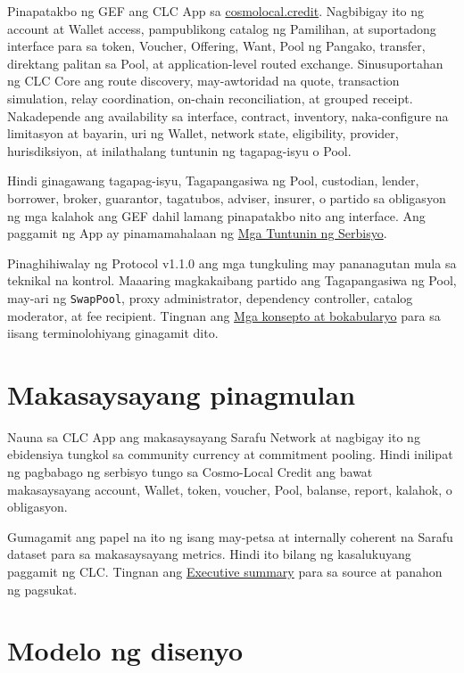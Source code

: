 \documentclass[11pt]{article}
\begin{document}
Pinapatakbo ng GEF ang CLC App sa \href{https://cosmolocal.credit}{cosmolocal.credit}. Nagbibigay ito ng account at Wallet access, pampublikong catalog ng Pamilihan, at suportadong interface para sa token, Voucher, Offering, Want, Pool ng Pangako, transfer, direktang palitan sa Pool, at application-level routed exchange. Sinusuportahan ng CLC Core ang route discovery, may-awtoridad na quote, transaction simulation, relay coordination, on-chain reconciliation, at grouped receipt. Nakadepende ang availability sa interface, contract, inventory, naka-configure na limitasyon at bayarin, uri ng Wallet, network state, eligibility, provider, hurisdiksiyon, at inilathalang tuntunin ng tagapag-isyu o Pool.

Hindi ginagawang tagapag-isyu, Tagapangasiwa ng Pool, custodian, lender, borrower, broker, guarantor, tagatubos, adviser, insurer, o partido sa obligasyon ng mga kalahok ang GEF dahil lamang pinapatakbo nito ang interface. Ang paggamit ng App ay pinamamahalaan ng \href{https://docs.cosmolocal.credit/fil/governance/terms}{Mga Tuntunin ng Serbisyo}.

Pinaghihiwalay ng Protocol v1.1.0 ang mga tungkuling may pananagutan mula sa teknikal na kontrol. Maaaring magkakaibang partido ang Tagapangasiwa ng Pool, may-ari ng \texttt{SwapPool}, proxy administrator, dependency controller, catalog moderator, at fee recipient. Tingnan ang \href{https://docs.cosmolocal.credit/fil/introduction/concepts}{Mga konsepto at bokabularyo} para sa iisang terminolohiyang ginagamit dito.

\section*{Makasaysayang pinagmulan}

Nauna sa CLC App ang makasaysayang Sarafu Network at nagbigay ito ng ebidensiya tungkol sa community currency at commitment pooling. Hindi inilipat ng pagbabago ng serbisyo tungo sa Cosmo-Local Credit ang bawat makasaysayang account, Wallet, token, voucher, Pool, balanse, report, kalahok, o obligasyon.

Gumagamit ang papel na ito ng isang may-petsa at internally coherent na Sarafu dataset para sa makasaysayang metrics. Hindi ito bilang ng kasalukuyang paggamit ng CLC. Tingnan ang \href{https://docs.cosmolocal.credit/fil/white-paper/executive-summary}{Executive summary} para sa source at panahon ng pagsukat.

\section*{Modelo ng disenyo}
\end{document}
